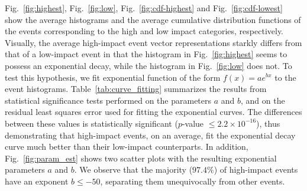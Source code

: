 Fig.~\ref{fig:highest}, Fig.~\ref{fig:low}, Fig.~\ref{fig:cdf-highest} and
Fig.~\ref{fig:cdf-lowest} show the average histograms and the average
cumulative distribution functions of the events corresponding to the
high and low impact categories, respectively.  Visually, the average
high-impact event vector representations starkly differs from that of
a low-impact event in that the histogram in Fig.~\ref{fig:highest}
seems to possess an exponential decay, while the histogram in
Fig.~\ref{fig:low} does not.  To test this hypothesis, we fit
exponential function of the form $f(x)=ae^{bx}$ to the event
histograms. Table~\ref{tab:curve_fitting} summarizes the results from
statistical significance tests performed on the parameters $a$ and
$b$, and on the residual least squares error used for fitting the
exponential curves.  The differences between these values is
statistically significant ($p$-value $\leq2.2\times 10^{-16}$), thus demonstrating
that high-impact events, on an average, fit the exponential decay
curve much better than their low-impact counterparts.  In addition,
Fig.~\ref{fig:param_est} shows two scatter plots with the resulting
exponential parameters $a$ and $b$.  We observe that the majority
($97.4\%$) of high-impact events have an exponent $b \leq -50$,
separating them unequivocally from other events.


 

